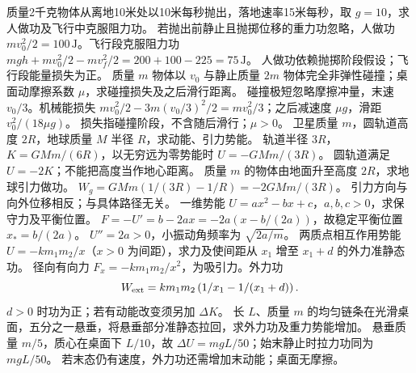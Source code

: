 \problemtext 质量2千克物体从离地10米处以10米每秒抛出，落地速率15米每秒，取 $g=10$，求人做功及飞行中克服阻力功。
\workings 若抛出前静止且抛掷位移的重力功忽略，人做功 $mv_0^2/2=100\,\mathrm J$。飞行段克服阻力功 $mgh+mv_0^2/2-mv_f^2/2=200+100-225=75\,\mathrm J$。
\crosscheck 人做功依赖抛掷阶段假设；飞行段能量损失为正。
\problemtext 质量 $m$ 物体以 $v_0$ 与静止质量 $2m$ 物体完全非弹性碰撞；桌面动摩擦系数 $\mu$，求碰撞损失及之后滑行距离。
\workings 碰撞极短忽略摩擦冲量，末速 $v_0/3$。机械能损失 $mv_0^2/2-3m(v_0/3)^2/2=mv_0^2/3$；之后减速度 $\mu g$，滑距 $v_0^2/(18\mu g)$。
\crosscheck 损失指碰撞阶段，不含随后滑行；$\mu>0$。
\problemtext 卫星质量 $m$，圆轨道高度 $2R$，地球质量 $M$ 半径 $R$，求动能、引力势能。
\workings 轨道半径 $3R$，$K=GMm/(6R)$，以无穷远为零势能时 $U=-GMm/(3R)$。
\crosscheck 圆轨道满足 $U=-2K$；不能把高度当作地心距离。
\problemtext 质量 $m$ 的物体由地面升至高度 $2R$，求地球引力做功。
\workings $W_g=GMm(1/(3R)-1/R)=-2GMm/(3R)$。
\crosscheck 引力方向与向外位移相反；与具体路径无关。
\problemtext 一维势能 $U=ax^2-bx+c$，$a,b,c>0$，求保守力及平衡位置。
\workings $F=-U'=b-2ax=-2a(x-b/(2a))$，故稳定平衡位置 $x_*=b/(2a)$。
\crosscheck $U''=2a>0$，小振动角频率为 $\sqrt{2a/m}$。
\problemtext 两质点相互作用势能 $U=-km_1m_2/x$（$x>0$ 为间距），求力及使间距从 $x_1$ 增至 $x_1+d$ 的外力准静态功。
\workings 径向有向力 $F_x=-km_1m_2/x^2$，为吸引力。外力功
\[
W_{\rm ext}=km_1m_2\left(1/x_1-1/(x_1+d)\right).
\]
\crosscheck $d>0$ 时功为正；若有动能改变须另加 $\Delta K$。
\problemtext 长 $L$、质量 $m$ 的均匀链条在光滑桌面，五分之一悬垂，将悬垂部分准静态拉回，求外力功及重力势能增加。
\workings 悬垂质量 $m/5$，质心在桌面下 $L/10$，故 $\Delta U=mgL/50$；始末静止时拉力功同为 $mgL/50$。
\crosscheck 若末态仍有速度，外力功还需增加末动能；桌面无摩擦。

